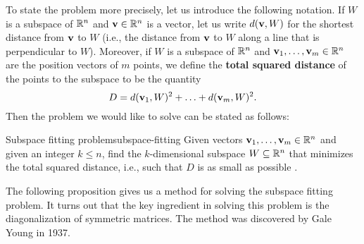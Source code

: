 To state the problem more precisely, let us introduce the following
notation. If $W$ is a subspace of $\mathbb{R}^n$ and $\vect{v}\in\R^n$ is a
vector, let us write $d(\vect{v},W)$ for the shortest distance from
$\vect{v}$ to $W$ (i.e., the distance from $\vect{v}$ to $W$ along a
line that is perpendicular to $W$). Moreover, if $W$ is a subspace of
$\mathbb{R}^n$ and $\vect{v}_1,\ldots,\vect{v}_m\in\R^n$ are the position
vectors of $m$ points, we define the \textbf{total squared distance}%
%
%
%
 of the points to
the subspace to be the quantity
\begin{equation*}
  D = d(\vect{v}_1,W)^2 + \ldots + d(\vect{v}_m,W)^2.
\end{equation*}
Then the problem we would like to solve can be stated as follows:

\begin{problem}{Subspace fitting problem}{subspace-fitting}
  Given vectors $\vect{v}_1,\ldots,\vect{v}_m\in\R^n$ and given an
  integer $k\leq n$, find the $k$-dimensional subspace
  $W\subseteq\mathbb{R}^n$ that minimizes the total squared distance, i.e.,
  such that $D$ is as small as possible%
  .
\end{problem}

The following proposition gives us a method for solving the subspace
fitting problem. It turns out that the key ingredient in solving this
problem is the diagonalization of symmetric matrices. The method was
discovered by Gale Young%
%
 in 1937.

